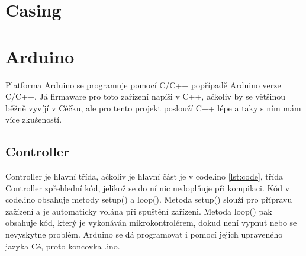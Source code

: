 
\section{Casing}
\section{Arduino}
Platforma Arduino se programuje pomocí C/C++ popřípadě Arduino verze C/C++. Já firmaware pro toto zařízení napíši v C++, ačkoliv by se většinou běžně vyvíjí v Céčku, ale pro tento projekt poslouží C++ lépe a taky s ním mám více zkušeností.
\subsection{Controller}

\newpage
Controller je hlavní třída, ačkoliv je hlavní část je v code.ino \ref{lst:code}, třída Controller zpřehlední kód, jelikož se do ní nic nedoplňuje při kompilaci. Kód v code.ino obsahuje metody setup() a loop(). Metoda setup() slouží pro přípravu zažízení a je automaticky volána při spuštění zařízeni. Metoda loop() pak obsahuje kód, který je vykonáván mikrokontrolérem, dokud není vypnut nebo se nevyskytne problém. Arduino se dá programovat i pomocí jejich upraveného jazyka Cé, proto koncovka .ino. 

